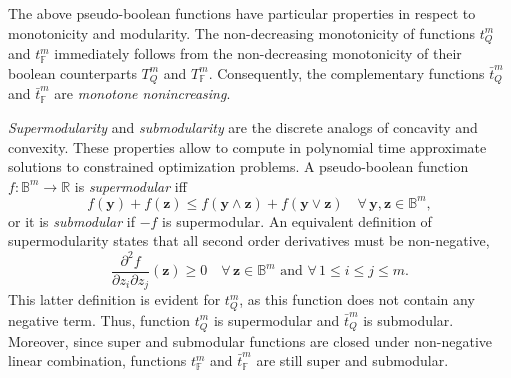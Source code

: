The above pseudo-boolean functions have particular properties in respect to monotonicity and modularity.
The non-decreasing monotonicity of functions $t_{Q}^{m}$ and $t_{\mathbb{F}}^{m}$ immediately follows from the non-decreasing monotonicity of their boolean counterparts $T_{Q}^{m}$ and $T_{\mathbb{F}}^{m}$.
Consequently, the complementary functions $\bar{t}_{Q}^{m}$ and $\bar{t}_{\mathbb{F}}^{m}$ are \emph{monotone nonincreasing}.

\emph{Supermodularity} and \emph{submodularity} are the discrete analogs of concavity and convexity.
These properties allow to compute in polynomial time approximate solutions to constrained optimization problems.
A pseudo-boolean function $f : \mathbb{B}^m \rightarrow \mathbb{R}$ is \emph{supermodular} iff 
\begin{equation}
\label{eq:supermodularity}
f(\mathbf{y}) + f(\mathbf{z}) \leq f(\mathbf{y} \wedge \mathbf{z}) + f(\mathbf{y} \vee \mathbf{z}) \quad \forall \, \mathbf{y}, \mathbf{z} \in \mathbb{B}^m,
\end{equation}
or it is \emph{submodular} if $-f$ is supermodular.
An equivalent definition of supermodularity states that all second order derivatives must be non-negative, \ie
\begin{equation}
\label{eq:supermodularity}
\frac{\partial^2 f}{\partial z_i \partial z_j}(\mathbf{z}) \geq 0 \quad \forall \, \mathbf{z} \in \mathbb{B}^m \text{ and } \forall \, 1 \leq i \leq j \leq m.
\end{equation}
This latter definition is evident for $t_{Q}^{m}$, as this function does not contain any negative term.
Thus, function $t_{Q}^{m}$ is supermodular and $\bar{t}_{Q}^{m}$ is submodular.
Moreover, since super and submodular functions are closed under non-negative linear combination, functions $t_{\mathbb{F}}^{m}$ and $\bar{t}_{\mathbb{F}}^{m}$ are still super and submodular.




